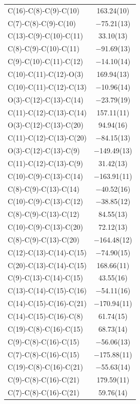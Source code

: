 \begin{center}
{\begin{supertabular}{p{1.5in}c}
C(16)-C(8)-C(9)-C(10)&163.24(10)\\
C(7)-C(8)-C(9)-C(10)&$-$75.21(13)\\
C(13)-C(9)-C(10)-C(11)&33.10(13)\\
C(8)-C(9)-C(10)-C(11)&$-$91.69(13)\\
C(9)-C(10)-C(11)-C(12)&$-$14.10(14)\\
C(10)-C(11)-C(12)-O(3)&169.94(13)\\
C(10)-C(11)-C(12)-C(13)&$-$10.96(14)\\
O(3)-C(12)-C(13)-C(14)&$-$23.79(19)\\
C(11)-C(12)-C(13)-C(14)&157.11(11)\\
O(3)-C(12)-C(13)-C(20)&94.94(16)\\
C(11)-C(12)-C(13)-C(20)&$-$84.15(13)\\
O(3)-C(12)-C(13)-C(9)&$-$149.49(13)\\
C(11)-C(12)-C(13)-C(9)&31.42(13)\\
C(10)-C(9)-C(13)-C(14)&$-$163.91(11)\\
C(8)-C(9)-C(13)-C(14)&$-$40.52(16)\\
C(10)-C(9)-C(13)-C(12)&$-$38.85(12)\\
C(8)-C(9)-C(13)-C(12)&84.55(13)\\
C(10)-C(9)-C(13)-C(20)&72.12(13)\\
C(8)-C(9)-C(13)-C(20)&$-$164.48(12)\\
C(12)-C(13)-C(14)-C(15)&$-$74.90(15)\\
C(20)-C(13)-C(14)-C(15)&168.66(11)\\
C(9)-C(13)-C(14)-C(15)&43.55(16)\\
C(13)-C(14)-C(15)-C(16)&$-$54.11(16)\\
C(14)-C(15)-C(16)-C(21)&$-$170.94(11)\\
C(14)-C(15)-C(16)-C(8)&61.74(15)\\
C(19)-C(8)-C(16)-C(15)&68.73(14)\\
C(9)-C(8)-C(16)-C(15)&$-$56.06(13)\\
C(7)-C(8)-C(16)-C(15)&$-$175.88(11)\\
C(19)-C(8)-C(16)-C(21)&$-$55.63(14)\\
C(9)-C(8)-C(16)-C(21)&179.59(11)\\
C(7)-C(8)-C(16)-C(21)&59.76(14)\\
\end{supertabular}
}
\end{center}

